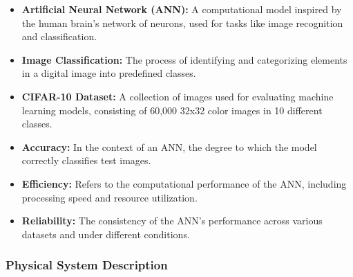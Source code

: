 \documentclass[12pt]{article}
\begin{document}
\begin{itemize}
\item \textbf{Artificial Neural Network (ANN):} A computational model inspired by the human brain's 
network of neurons, used for tasks like image recognition and classification.

\item \textbf{Image Classification:} The process of identifying and categorizing elements in a 
digital image into predefined classes.

\item \textbf{CIFAR-10 Dataset:} A collection of images used for evaluating machine learning 
models, consisting of 60,000 32x32 color images in 10 different classes.

\item \textbf{Accuracy:} In the context of an ANN, the degree to which the model correctly 
classifies test images.

\item \textbf{Efficiency:} Refers to the computational performance of the ANN, including 
processing speed and resource utilization.

\item \textbf{Reliability:} The consistency of the ANN's performance across various datasets 
and under different conditions.
\end{itemize}

\subsubsection{Physical System Description} \label{sec_phySystDescrip}

\end{document}
